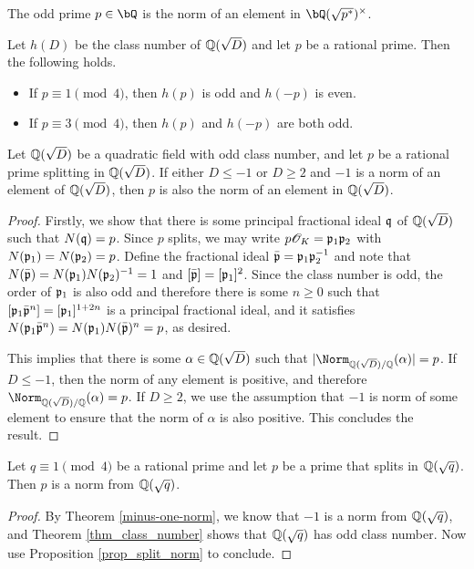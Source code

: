 \begin{cor}\label{p-norm}
The odd prime $p \in \bQ$ is the norm of an element in $\bQ(\sqrt{p^*})^{\times}$.
\end{cor}

\begin{thm}\label{thm_class_number}
    Let $h(D)$ be the class number of $\mathbb{Q}(\sqrt{D})$ and let $p$ be a rational prime. Then the following holds.
    \begin{itemize}
        \item If $p\equiv1\pmod{4}$, then $h(p)$ is odd and $h(-p)$ is even.
        \item If $p\equiv3\pmod{4}$, then $h(p)$ and $h(-p)$ are both odd.
    \end{itemize}
\end{thm}

\begin{prop}\label{prop_split_norm}
    Let $\mathbb{Q}(\sqrt{D})$ be a quadratic field with odd class number, and let $p$ be a rational prime splitting in $\mathbb{Q}(\sqrt{D})$. If either $D\leq -1$ or $D\geq 2$ and $-1$ is a norm of an element of $\mathbb{Q}(\sqrt{D})$, then $p$ is also the norm of an element in $\mathbb{Q}(\sqrt{D})$.
\end{prop}

\begin{proof}
    Firstly, we show that there is some principal fractional ideal $\mathfrak{q}$ of $\mathbb{Q}(\sqrt{D})$ such that $N(\mathfrak{q})=p$. Since $p$ splits, we may write $p\mathcal{O}_K=\mathfrak{p}_1\mathfrak{p}_2$ with $N(\mathfrak{p}_1)=N(\mathfrak{p}_2)=p$. Define the fractional ideal $\bar{\mathfrak{p}}=\mathfrak{p}_1\mathfrak{p}_2^{-1}$ and note that $N(\bar{\mathfrak{p}})=N(\mathfrak{p}_1)N(\mathfrak{p}_2)^{-1}=1$ and $[\bar{\mathfrak{p}}]=[\mathfrak{p}_1]^2$. Since the class number is odd, the order of $\mathfrak{p}_1$ is also odd and therefore there is some $n\geq 0$ such that $[\mathfrak{p}_1\bar{\mathfrak{p}}^n]=[\mathfrak{p}_1]^{1+2n}$ is a principal fractional ideal, and it satisfies $N(\mathfrak{p}_1\bar{\mathfrak{p}}^n)=N(\mathfrak{p}_1)N(\bar{\mathfrak{p}})^n=p$, as desired. 

    This implies that there is some $\alpha\in\mathbb{Q}(\sqrt{D})$ such that $|\Norm_{\QQ(\sqrt{D})/\QQ}(\alpha)|=p$. If $D\leq -1$, then the norm of any element is positive, and therefore $\Norm_{\QQ(\sqrt{D})/\QQ}(\alpha)=p$. If $D\geq 2$, we use the assumption that $-1$ is norm of some element to ensure that the norm of $\alpha$ is also positive. This concludes the result.
\end{proof}

\begin{cor}\label{cor_psplit_pnorm}
    Let $q\equiv1\pmod{4}$ be a rational prime and let $p$ be a prime that splits in $\mathbb{Q}(\sqrt{q})$. Then $p$ is a norm from $\mathbb{Q}(\sqrt{q})$. 
\end{cor}
\begin{proof}
    By Theorem \ref{minus-one-norm}, we know that $-1$ is a norm from $\mathbb{Q}(\sqrt{q})$, and Theorem \ref{thm_class_number} shows that $\mathbb{Q}(\sqrt{q})$ has odd class number. Now use Proposition \ref{prop_split_norm} to conclude.
\end{proof}